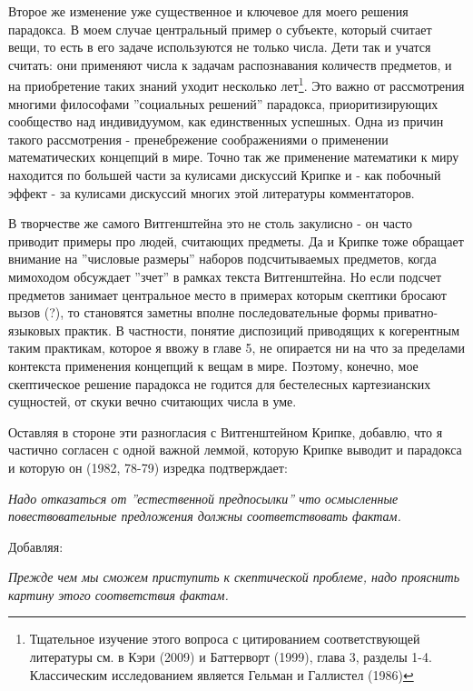 \documentclass[12pt]{book}
\begin{document}
Второе же изменение уже существенное и ключевое для моего решения парадокса. В моем случае центральный пример о субъекте, который считает вещи, то есть в его задаче используются не только числа. Дети так и учатся считать: они применяют числа к задачам распознавания количеств предметов, и на приобретение таких знаний уходит несколько лет\footnote{Тщательное изучение этого вопроса с цитированием соответствующей литературы см. в Кэри (2009) и Баттерворт (1999), глава 3, разделы 1-4. Классическим исследованием является Гельман и Галлистел (1986)}. Это важно от рассмотрения многими философами ''социальных решений'' парадокса, приоритизирующих сообщество над индивидуумом, как единственных успешных. Одна из причин такого рассмотрения - пренебрежение соображениями о применении математических концепций в мире. Точно так же применение математики к миру находится по большей части за кулисами дискуссий Крипке и - как побочный эффект - за кулисами дискуссий многих этой литературы комментаторов.

В творчестве же самого Витгенштейна это не столь закулисно - он часто приводит примеры про людей, считающих предметы. Да и Крипке тоже обращает внимание на ''числовые размеры'' наборов подсчитываемых предметов, когда мимоходом обсуждает ''зчет'' в рамках текста Витгенштейна. Но если подсчет предметов занимает центральное место в примерах которым скептики бросают вызов (?), то становятся заметны вполне последовательные формы приватно-языковых практик. В частности, понятие диспозиций приводящих к когерентным таким практикам, которое я ввожу в главе 5, не опирается ни на что за пределами контекста применения концепций к вещам в мире. Поэтому, конечно, мое скептическое решение парадокса не годится для бестелесных картезианских сущностей, от скуки вечно считающих числа в уме.

Оставляя в стороне эти разногласия с Витгенштейном Крипке, добавлю, что я частично согласен с одной важной леммой, которую Крипке выводит и парадокса и которую он (1982, 78-79) изредка подтверждает:

\smallskip

\textit{Надо отказаться от ''естественной предпосылки'' что осмысленные повествовательные предложения должны соответствовать фактам.}

\smallskip

Добавляя:

\smallskip

\textit{Прежде чем мы сможем приступить к скептической проблеме, надо прояснить картину этого соответствия фактам.}
\end{document}
